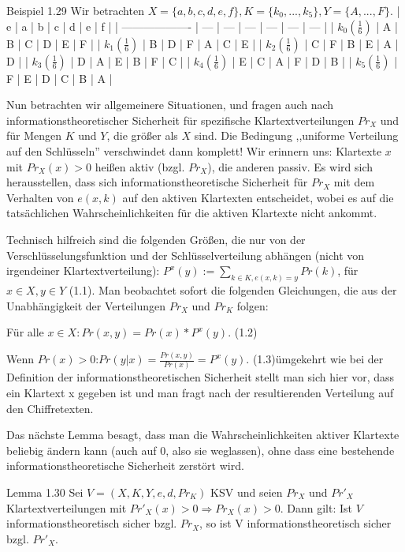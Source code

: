 \documentclass[a4paper]{article}
\begin{document}
\begin{multicols}{3}
    Beispiel 1.29 Wir betrachten $X=\{a,b,c,d,e,f\},K=\{k_0 ,...,k_5\},Y=\{A,...,F\}$.
    | e                   | a   | b   | c   | d   | e   | f   |
    | ------------------- | --- | --- | --- | --- | --- | --- |
    | $k_0 (\frac{1}{6})$ | A   | B   | C   | D   | E   | F   |
    | $k_1 (\frac{1}{6})$ | B   | D   | F   | A   | C   | E   |
    | $k_2 (\frac{1}{6})$ | C   | F   | B   | E   | A   | D   |
    | $k_3 (\frac{1}{6})$ | D   | A   | E   | B   | F   | C   |
    | $k_4 (\frac{1}{6})$ | E   | C   | A   | F   | D   | B   |
    | $k_5 (\frac{1}{6})$ | F   | E   | D   | C   | B   | A   |

    Nun betrachten wir allgemeinere Situationen, und fragen auch nach informationstheoretischer Sicherheit für spezifische Klartextverteilungen $Pr_X$ und für Mengen $K$ und $Y$, die größer als $X$ sind. Die Bedingung ,,uniforme Verteilung auf den Schlüsseln'' verschwindet dann komplett! Wir erinnern uns: Klartexte $x$ mit $Pr_X(x)> 0$ heißen aktiv (bzgl. $Pr_X$), die anderen passiv. Es wird sich herausstellen, dass sich informationstheoretische Sicherheit für $Pr_X$ mit dem Verhalten von $e(x,k)$ auf den aktiven Klartexten entscheidet, wobei es auf die tatsächlichen Wahrscheinlichkeiten für die aktiven Klartexte nicht ankommt.

    Technisch hilfreich sind die folgenden Größen, die nur von der Verschlüsselungsfunktion und der Schlüsselverteilung abhängen (nicht von irgendeiner Klartextverteilung): $P^x(y):=\sum_{k\in K, e(x,k)=y} Pr(k)$, für $x\in X,y\in Y$ (1.1).
    Man beobachtet sofort die folgenden Gleichungen, die aus der Unabhängigkeit der Verteilungen $Pr_X$ und $Pr_K$ folgen:
    \begin{itemize*}
        \item Für alle $x\in X:Pr(x,y) = Pr(x)*P^x(y)$. (1.2)
        \item Wenn $Pr(x)> 0$:$Pr(y|x) = \frac{Pr(x,y)}{Pr(x)}=P^x(y)$. (1.3)ümgekehrt wie bei der Definition der informationstheoretischen Sicherheit stellt man sich hier vor, dass ein Klartext x gegeben ist und man fragt nach der resultierenden Verteilung auf den Chiffretexten.
    \end{itemize*}
    Das nächste Lemma besagt, dass man die Wahrscheinlichkeiten aktiver Klartexte beliebig ändern kann (auch auf 0, also sie weglassen), ohne dass eine bestehende informationstheoretische Sicherheit zerstört wird.

    Lemma 1.30 Sei $V=(X,K,Y,e,d,Pr_K)$ KSV und seien $Pr_X$ und $Pr'_X$ Klartextverteilungen mit $Pr'_X(x)>0\Rightarrow Pr_X(x)>0$. Dann gilt: Ist $V$ informationstheoretisch sicher bzgl. $Pr_X$, so ist V informationstheoretisch sicher bzgl. $Pr'_X$.


\end{multicols}
\end{document}
